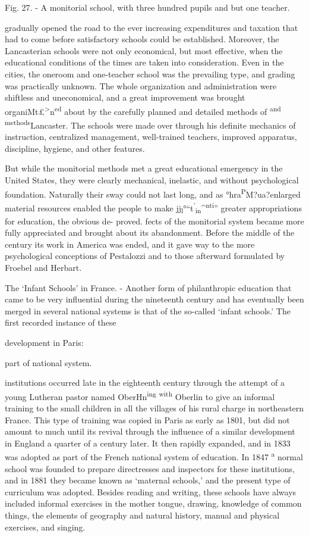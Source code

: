 \documentclass[]{book}
\begin{document}
Fig. 27. - A monitorial school, with three hundred pupils and but one teacher.

gradually opened the road to the ever increasing expenditures and taxation that had to come before satisfactory schools could be established. Moreover, the Lancasterian schools were not only economical, but most effective, when the educational conditions of the times are taken into consideration. Even in the cities, the oneroom and one-teacher school was the prevailing type, and grading was practically unknown. The whole organization and administration were shiftless and uneconomical, and a great improvement was brought organiMt£\textsuperscript{\textgreater{}}n\textsuperscript{ed} about by the carefully planned and detailed methods of \textsuperscript{and} \textsuperscript{methods}Lancaster. The schools were made over through his definite mechanics of instruction, centralized management, well-trained teachers, improved apparatus, discipline, hygiene, and other features.

But while the monitorial methods met a great educational emergency in the United States, they were clearly mechanical, inelastic, and without psychological foundation. Naturally their sway could not last long, and as °hra\textsuperscript{P}M?ua?enlarged material resources enabled the people to make jj\textsubscript{l}°``t\textsuperscript{'}\textsubscript{in}\^{}\textsuperscript{nti}'' greater appropriations for education, the obvious de- proved. fects of the monitorial system became more fully appreciated and brought about its abandonment. Before the middle of the century its work in America was ended, and it gave way to the more psychological conceptions of Pestalozzi and to those afterward formulated by Froebel and Herbart.

The `Infant Schools' in France. - Another form of philanthropic education that came to be very influential during the nineteenth century and has eventually been merged in several national systems is that of the so-called `infant schools.' The first recorded instance of these

development in Paris:

part of national system.

institutions occurred late in the eighteenth century through the attempt of a young Lutheran pastor named OberHn\textsuperscript{ing} \textsuperscript{with} Oberlin to give an informal training to the small children in all the villages of his rural charge in northeastern France. This type of training was copied in Paris as early as 1801, but did not amount to much until its revival through the influence of a similar development in England a quarter of a century later. It then rapidly expanded, and in 1833 was adopted as part of the French national system of education. In 1847 \textsuperscript{a} normal school was founded to prepare directresses and inspectors for these institutions, and in 1881 they became known as `maternal schools,' and the present type of curriculum was adopted. Besides reading and writing, these schools have always included informal exercises in the mother tongue, drawing, knowledge of common things, the elements of geography and natural history, manual and physical exercises, and singing.
\end{document}
